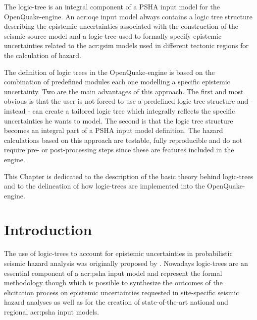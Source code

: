 %
The logic-tree is an integral component of a PSHA input model for the 
OpenQuake-engine. 
%
An \gls{acr:oqe} input model always contains a logic tree structure 
describing the epistemic uncertainties associated with the construction 
of the seismic source model and a logic-tree used to formally specify 
epistemic uncertainties related to the \gls{acr:gsim} models used in 
different tectonic regions for the calculation of hazard.

The definition of logic trees in the OpenQuake-engine is based on
the combination of predefined modules each one modelling a specific 
epistemic uncertainty.
%
Two are the main advantages of this approach. The first and most obvious  
is that the user is not forced to use a predefined logic tree structure and
- instead - can create a tailored logic tree which integrally 
reflects the specific uncertainties he wants to model. 
%
The second is that the logic tree structure becomes an integral part of  
a PSHA input model definition. The hazard calculations based on this approach
are testable, fully reproducible and do not require pre- or 
post-processing steps since these are features included in the engine.

This Chapter is dedicated to the description of the basic theory behind 
logic-trees and to the delineation of how logic-trees are implemented 
into the OpenQuake-engine.
%
\section{Introduction}
The use of logic-trees to account for epistemic uncertainties in  
probabilistic seismic hazard analysis was originally proposed by 
\textcite{kulkarni84}.
%
Nowadays logic-trees are an essential component of a \gls{acr:psha} input
model and represent the formal methodology though which is possible to 
synthesize the outcomes of the elicitation process on epistemic uncertainties
requested in site-specific seismic hazard analyses \parencite{budnitz1997}
as well as for the creation of state\--of\--the\--art national and 
regional \gls{acr:psha} input models. 

